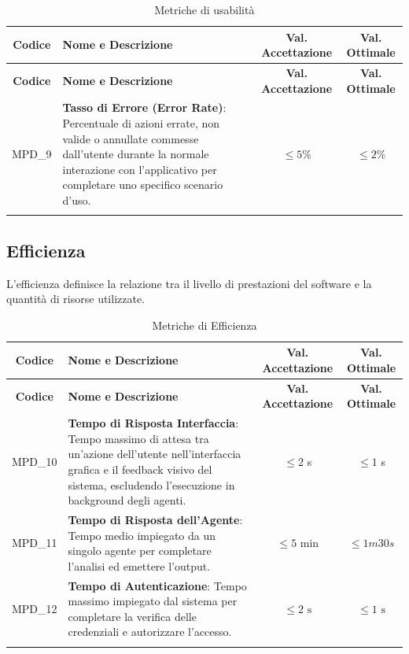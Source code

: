 \documentclass[12pt, a4paper]{article}
\newlength{\LargColVal} %
\begin{document}
\renewcommand{\arraystretch}{1.3}
\begin{xltabular}{\textwidth}{|c|X|C{\LargColVal}|C{\LargColVal}|}

    \hline
    \textbf{Codice} & \textbf{Nome e Descrizione} & \textbf{Val. Accettazione} & \textbf{Val. Ottimale} \\ \hline
    \endfirsthead

    \hline
    \textbf{Codice} & \textbf{Nome e Descrizione} & \textbf{Val. Accettazione} & \textbf{Val. Ottimale} \\ \hline
    \endhead

    MPD\_9& \textbf{Tasso di Errore (Error Rate)}: Percentuale di azioni errate, non valide o annullate commesse dall'utente durante la normale interazione con l'applicativo per completare uno specifico scenario d'uso. & $\le 5\%$ & $\le 2\%$ \\ \hline

\caption{Metriche di usabilità}
    \label{tab:prod_usabilita}
\end{xltabular}

\subsection{Efficienza}
L'efficienza definisce la relazione tra il livello di prestazioni del software e la quantità di risorse utilizzate.

\renewcommand{\arraystretch}{1.3}
\begin{xltabular}{\textwidth}{|c|X|C{\LargColVal}|C{\LargColVal}|}

    \hline
    \textbf{Codice} & \textbf{Nome e Descrizione} & \textbf{Val. Accettazione} & \textbf{Val. Ottimale} \\ \hline
    \endfirsthead

    \hline
    \textbf{Codice} & \textbf{Nome e Descrizione} & \textbf{Val. Accettazione} & \textbf{Val. Ottimale} \\ \hline
    \endhead

    MPD\_10& \textbf{Tempo di Risposta Interfaccia}: Tempo massimo di attesa tra un'azione dell'utente nell'interfaccia grafica e il feedback visivo del sistema, escludendo l'esecuzione in background degli agenti. & $\le 2$ s & $\le 1$ s \\ \hline
    MPD\_11 & \textbf{Tempo di Risposta dell'Agente}: Tempo medio impiegato da un singolo agente per completare l'analisi ed emettere l'output. & $\le 5$ min & $\le 1m 30s$ \\ \hline
    MPD\_12 & \textbf{Tempo di Autenticazione}: Tempo massimo impiegato dal sistema per completare la verifica delle credenziali e autorizzare l'accesso. & $\le 2 \text{ s}$ & $\le 1 \text{ s}$ \\ \hline
    \caption{Metriche di Efficienza}
    \label{tab:prod_efficienza}
\end{xltabular}
\end{document}
